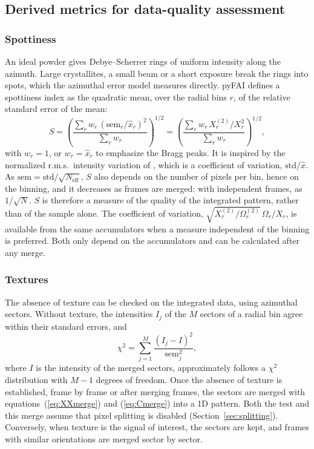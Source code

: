 \documentclass{iucrjournals}
\newcommand{\mean}[1]{\widehat{#1}}
\newcommand{\Om}{\Omega}
\newcommand{\OmS}{\Omega^{(2)}}
\newcommand{\XX}{X^{(2)}}
\begin{document}
\subsection{Derived metrics for data-quality assessment}
\label{sec:metrics}

\subsubsection{Spottiness}
\label{spottiness}

An ideal powder gives Debye--Scherrer rings of uniform intensity along the azimuth.
Large crystallites, a small beam or a short exposure break the rings into spots, which the azimuthal error model measures directly.
pyFAI defines a spottiness index as the quadratic mean, over the radial bins $r$, of the relative standard error of the mean:
\begin{equation}
  S = \left(\frac{\sum_r w_r\,\left(\mathrm{sem}_r/\mean{x}_r\right)^2}{\sum_r w_r}\right)^{1/2}
    = \left(\frac{\sum_r w_r\,\XX_r/X_r^2}{\sum_r w_r}\right)^{1/2},
  \label{eq:spottiness}
\end{equation}
with $w_r=1$, or $w_r=\mean{x}_r$ to emphasize the Bragg peaks.
It is inspired by the normalized r.m.s.\ intensity variation of , which is a coefficient of variation, $\mathrm{std}/\mean{x}$.
As $\mathrm{sem}=\mathrm{std}/\sqrt{N_\mathrm{eff}}$, $S$ also depends on the number of pixels per bin, hence on the binning, and it decreases as frames are merged: with independent frames, as $1/\sqrt{N}$.
$S$ is therefore a measure of the quality of the integrated pattern, rather than of the sample alone.
The coefficient of variation, $\sqrt{\XX_r/\OmS_r}\,\Om_r/X_r$, is available from the same accumulators when a measure independent of the binning is preferred.
Both only depend on the accumulators and can be calculated after any merge.

\subsubsection{Textures}
\label{sec:texture}

The absence of texture can be checked on the integrated data, using azimuthal sectors.
Without texture, the intensities $I_j$ of the $M$ sectors of a radial bin agree within their standard errors, and
\begin{equation}
  \chi^2 = \sum_{j=1}^{M}\frac{\left(I_j-I\right)^2}{\mathrm{sem}_j^2},
  \label{eq:chi2}
\end{equation}
where $I$ is the intensity of the merged sectors, approximately follows a $\chi^2$ distribution with $M-1$ degrees of freedom.
Once the absence of texture is established, frame by frame or after merging frames, the sectors are merged with equations~(\ref{eq:XXmerge}) and (\ref{eq:Cmerge}) into a 1D pattern.
Both the test and this merge assume that pixel splitting is disabled (Section~\ref{sec:splitting}).
Conversely, when texture is the signal of interest, the sectors are kept, and frames with similar orientations are merged sector by sector.
\end{document}
